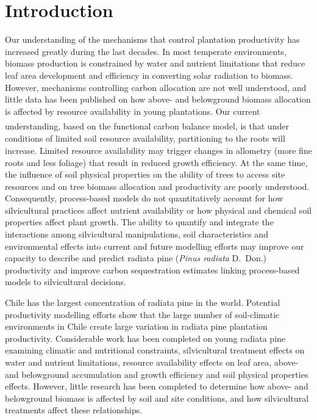 \documentclass[final]{foresj}
\begin{document}
\maketitle

\section{Introduction}

Our understanding of the mechanisms that control plantation
productivity has increased greatly during the last
decades.\cite{1,2,3,4,5,6} In most temperate environments,
biomass production is constrained by water and nutrient
limitations that reduce leaf area development and
efficiency in converting solar radiation to
biomass.\cite{1,7,8,9,10} However, mechanisms controlling
carbon allocation are not well understood, and little data
has been published on how above- and belowground biomass
allocation is affected by resource availability in young
plantations.\cite{11,12} Our current understanding, based
on the functional carbon balance model,\cite{13} is that
under$^{\vphantom{A^{A^{A^{A}}}}}$ conditions of limited soil resource availability,
partitioning to the roots will increase.\cite{4,14,15,16}
Limited resource availability may trigger changes in
allometry (more fine roots and less foliage) that result in
reduced growth efficiency.\cite{12,17} At the same time,
the influence of soil physical properties on the ability of
trees to access site resources and on tree biomass \nobreak
allocation and productivity are poorly understood.
Consequently, process-based models do not quantitatively
account for how silvicultural practices affect nutrient
availability\cite{18} or how physical and chemical soil
properties affect plant growth. The ability to quantify and
integrate the interactions among silvicultural
manipulations, soil characteristics and environmental
effects into current and future modelling efforts may
improve our capacity to describe and predict radiata pine
(\textit{Pinus radiata} D.~Don.) productivity and improve
carbon sequestration estimates\cite{19,20} linking
process-based \hbox{models} to silvicultural decisions.

Chile has the largest concentration of radiata pine in the
world. Potential productivity modelling efforts show that
the large number of soil-climatic environments in Chile
create large variation in radiata pine plantation
productivity.\cite{21} Considerable work has been completed
on young radiata pine examining climatic and nutritional
constraints,\cite{22,23,24,25,26} silvicultural treatment
effects on water and nutrient limitations,\cite{27,28,29,30,31,32}
resource availability effects on leaf area, above- and belowground accumulation
and growth efficiency\cite{8,33,34,35} and soil physical
properties effects.\cite{36,37,38,39,40,41} However, little
research has been completed to determine how above- and
belowground biomass is affected by soil and site
conditions, and how silvicultural treatments affect these
relationships.
\end{document}
